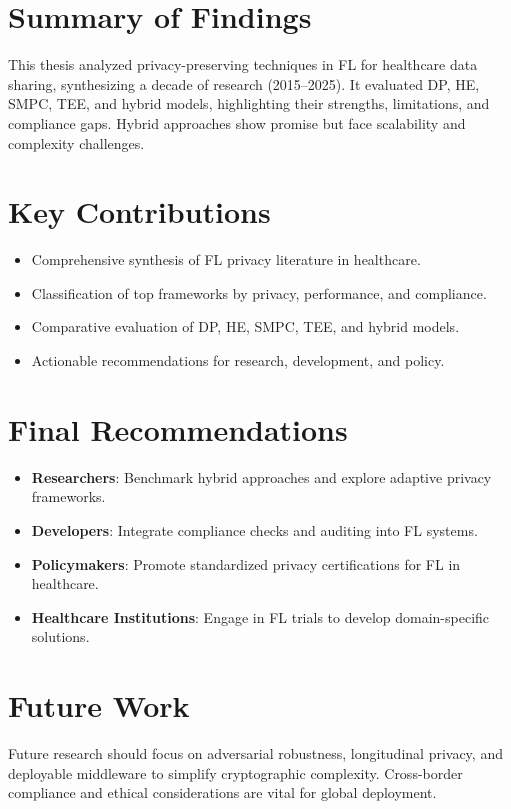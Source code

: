 \documentclass[12pt]{report}
\begin{document}
\section{Summary of Findings}
This thesis analyzed privacy-preserving techniques in FL for healthcare data sharing, synthesizing a decade of research (2015–2025). It evaluated DP, HE, SMPC, TEE, and hybrid models, highlighting their strengths, limitations, and compliance gaps. Hybrid approaches show promise but face scalability and complexity challenges.

\section{Key Contributions}
\begin{itemize}
    \item Comprehensive synthesis of FL privacy literature in healthcare.
    \item Classification of top frameworks by privacy, performance, and compliance.
    \item Comparative evaluation of DP, HE, SMPC, TEE, and hybrid models.
    \item Actionable recommendations for research, development, and policy.
\end{itemize}

\section{Final Recommendations}
\begin{itemize}
    \item \textbf{Researchers}: Benchmark hybrid approaches and explore adaptive privacy frameworks.
    \item \textbf{Developers}: Integrate compliance checks and auditing into FL systems.
    \item \textbf{Policymakers}: Promote standardized privacy certifications for FL in healthcare.
    \item \textbf{Healthcare Institutions}: Engage in FL trials to develop domain-specific solutions.
\end{itemize}

\section{Future Work}
Future research should focus on adversarial robustness, longitudinal privacy, and deployable middleware to simplify cryptographic complexity. Cross-border compliance and ethical considerations are vital for global deployment.
\end{document}
